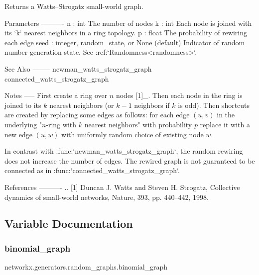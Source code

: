 \begin{DoxyVerb}Returns a Watts–Strogatz small-world graph.

Parameters
----------
n : int
    The number of nodes
k : int
    Each node is joined with its `k` nearest neighbors in a ring
    topology.
p : float
    The probability of rewiring each edge
seed : integer, random_state, or None (default)
    Indicator of random number generation state.
    See :ref:`Randomness<randomness>`.

See Also
--------
newman_watts_strogatz_graph
connected_watts_strogatz_graph

Notes
-----
First create a ring over $n$ nodes [1]_.  Then each node in the ring is joined
to its $k$ nearest neighbors (or $k - 1$ neighbors if $k$ is odd).
Then shortcuts are created by replacing some edges as follows: for each
edge $(u, v)$ in the underlying "$n$-ring with $k$ nearest neighbors"
with probability $p$ replace it with a new edge $(u, w)$ with uniformly
random choice of existing node $w$.

In contrast with :func:`newman_watts_strogatz_graph`, the random rewiring
does not increase the number of edges. The rewired graph is not guaranteed
to be connected as in :func:`connected_watts_strogatz_graph`.

References
----------
.. [1] Duncan J. Watts and Steven H. Strogatz,
   Collective dynamics of small-world networks,
   Nature, 393, pp. 440--442, 1998.
\end{DoxyVerb}
 

\subsection{Variable Documentation}
\mbox{\label{namespacenetworkx_1_1generators_1_1random__graphs_a6fa50eb1a47527d3e8e7c511d1533d7a}} 
\subsubsection{\texorpdfstring{binomial\+\_\+graph}{binomial\_graph}}
{\footnotesize\ttfamily networkx.\+generators.\+random\+\_\+graphs.\+binomial\+\_\+graph}

